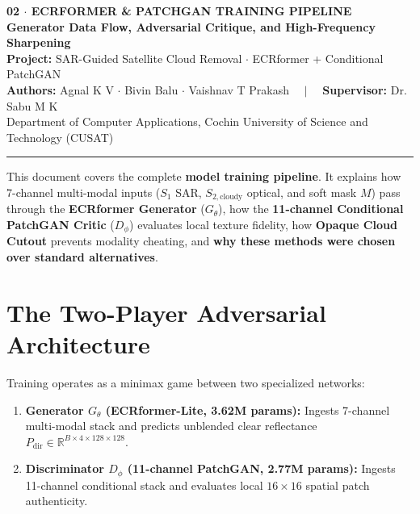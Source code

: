 \documentclass[11pt,a4paper]{article}
\begin{document}
\begin{center}
    {\LARGE \textbf{\textcolor{primary}{02 $\cdot$ ECRFORMER \& PATCHGAN TRAINING PIPELINE}}}\\[0.4em]
    {\large \textbf{Generator Data Flow, Adversarial Critique, and High-Frequency Sharpening}}\\[0.6em]
    {\small \textbf{Project:} SAR-Guided Satellite Cloud Removal $\cdot$ ECRformer + Conditional PatchGAN}\\
    {\small \textbf{Authors:} Agnal K V $\cdot$ Bivin Balu $\cdot$ Vaishnav T Prakash $\quad|\quad$ \textbf{Supervisor:} Dr. Sabu M K}\\
    {\small Department of Computer Applications, Cochin University of Science and Technology (CUSAT)}
\end{center}
\vspace{-0.5em}
\noindent\rule{\linewidth}{1.2pt}

\vspace{0.8em}
\begin{tcolorbox}[colback=primary!5!white,colframe=primary,title=\textbf{Document Purpose \& Training Architecture},fonttitle=\bfseries]
This document covers the complete \textbf{model training pipeline}. It explains how 7-channel multi-modal inputs ($S_1$ SAR, $S_{2,\text{cloudy}}$ optical, and soft mask $M$) pass through the \textbf{ECRformer Generator} ($G_\theta$), how the \textbf{11-channel Conditional PatchGAN Critic} ($D_\phi$) evaluates local texture fidelity, how \textbf{Opaque Cloud Cutout} prevents modality cheating, and \textbf{why these methods were chosen over standard alternatives}.
\end{tcolorbox}

\section{The Two-Player Adversarial Architecture}

Training operates as a minimax game between two specialized networks:
\begin{enumerate}[leftmargin=1.5em, itemsep=0.3em]
    \item \textbf{Generator $G_\theta$ (ECRformer-Lite, 3.62M params):} Ingests 7-channel multi-modal stack and predicts unblended clear reflectance $P_{\text{dir}} \in \mathbb{R}^{B \times 4 \times 128 \times 128}$.
    \item \textbf{Discriminator $D_\phi$ (11-channel PatchGAN, 2.77M params):} Ingests 11-channel conditional stack and evaluates local $16 \times 16$ spatial patch authenticity.
\end{enumerate}
\end{document}

